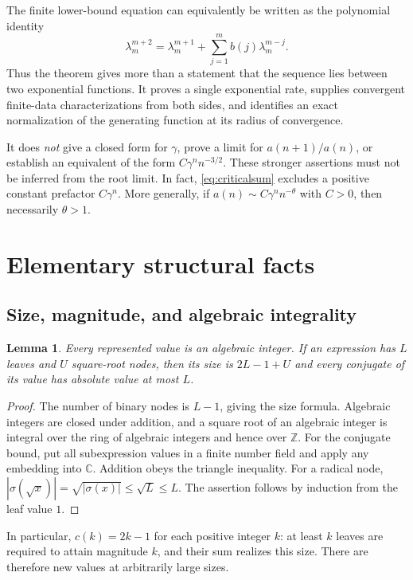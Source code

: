 \documentclass[11pt,letterpaper]{article}
\numberwithin{equation}{section}
\newtheorem{lemma}[theorem]{Lemma}
\theoremstyle{definition}
\newcommand{\Z}{\mathbb Z}
\begin{document}
The finite lower-bound equation can equivalently be written as the polynomial
identity
\begin{equation}\label{eq:lambda-polynomial}
 \lambda_m^{m+2}=\lambda_m^{m+1}
       +\sum_{j=1}^m b(j)\lambda_m^{m-j}.
\end{equation}
Thus the theorem gives more than a statement that the sequence lies between
two exponential functions. It proves a single exponential rate, supplies
convergent finite-data characterizations from both sides, and identifies an
exact normalization of the generating function at its radius of convergence.

It does \emph{not} give a closed form for $\gamma$, prove a limit for
$a(n+1)/a(n)$, or establish an equivalent of the form
$C\gamma^n n^{-3/2}$. These stronger assertions must not be inferred from the
root limit. In fact, \eqref{eq:criticalsum} excludes a positive constant
prefactor $C\gamma^n$. More generally, if
$a(n)\sim C\gamma^n n^{-\theta}$ with $C>0$, then necessarily $\theta>1$.

\section{Elementary structural facts}

\subsection{Size, magnitude, and algebraic integrality}

\begin{lemma}\label{lem:basic}
Every represented value is an algebraic integer. If an expression has $L$
leaves and $U$ square-root nodes, then its size is $2L-1+U$ and every conjugate
of its value has absolute value at most $L$.
\end{lemma}
\begin{proof}
The number of binary nodes is $L-1$, giving the size formula. Algebraic
integers are closed under addition, and a square root of an algebraic integer
is integral over the ring of algebraic integers and hence over $\Z$.
For the conjugate bound, put all subexpression values in a finite number field
and apply any embedding into $\mathbb C$. Addition obeys the triangle
inequality. For a radical node,
$|\sigma(\sqrt x)|=\sqrt{|\sigma(x)|}\le\sqrt L\le L$.
The assertion follows by induction from the leaf value $1$.
\end{proof}

In particular, $c(k)=2k-1$ for each positive integer $k$: at least $k$ leaves
are required to attain magnitude $k$, and their sum realizes this size.
There are therefore new values at arbitrarily large sizes.
\end{document}
